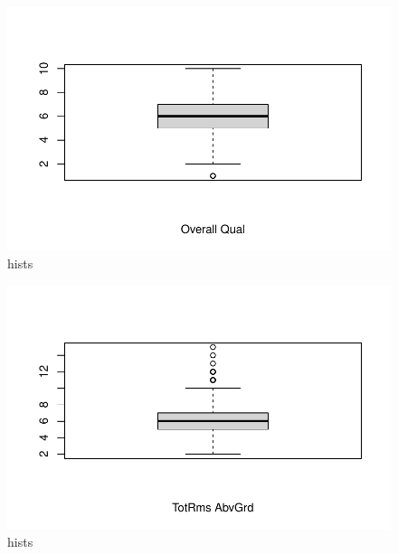 \documentclass[
  letterpaper,
  DIV=11,
  numbers=noendperiod]{scrartcl}
\begin{document}
\begin{figure}[H]

{\centering \includegraphics{paper_files/figure-pdf/histbox-3.pdf}

}

\caption{hists}

\end{figure}%

\begin{figure}[H]

{\centering \includegraphics{paper_files/figure-pdf/histbox-4.pdf}

}

\caption{hists}

\end{figure}%
\end{document}
